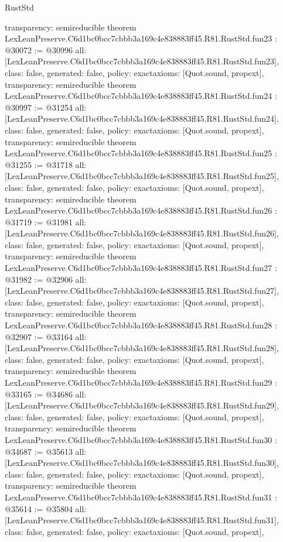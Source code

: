 \begin{lexlean}{RustStd}
\begin{coremodule}
{  transparency: semireducible
}
theorem LexLeanPreserve.C6d1bc0bcc7cbbb3a169c4e838883ff45.R81.RustStd.fun23 : @30072 := @30996 {
  all: [LexLeanPreserve.C6d1bc0bcc7cbbb3a169c4e838883ff45.R81.RustStd.fun23],
  class: false,
  generated: false,
  policy: exact{axioms: [Quot.sound, propext]},
  transparency: semireducible
}
theorem LexLeanPreserve.C6d1bc0bcc7cbbb3a169c4e838883ff45.R81.RustStd.fun24 : @30997 := @31254 {
  all: [LexLeanPreserve.C6d1bc0bcc7cbbb3a169c4e838883ff45.R81.RustStd.fun24],
  class: false,
  generated: false,
  policy: exact{axioms: [Quot.sound, propext]},
  transparency: semireducible
}
theorem LexLeanPreserve.C6d1bc0bcc7cbbb3a169c4e838883ff45.R81.RustStd.fun25 : @31255 := @31718 {
  all: [LexLeanPreserve.C6d1bc0bcc7cbbb3a169c4e838883ff45.R81.RustStd.fun25],
  class: false,
  generated: false,
  policy: exact{axioms: [Quot.sound, propext]},
  transparency: semireducible
}
theorem LexLeanPreserve.C6d1bc0bcc7cbbb3a169c4e838883ff45.R81.RustStd.fun26 : @31719 := @31981 {
  all: [LexLeanPreserve.C6d1bc0bcc7cbbb3a169c4e838883ff45.R81.RustStd.fun26],
  class: false,
  generated: false,
  policy: exact{axioms: [Quot.sound, propext]},
  transparency: semireducible
}
theorem LexLeanPreserve.C6d1bc0bcc7cbbb3a169c4e838883ff45.R81.RustStd.fun27 : @31982 := @32906 {
  all: [LexLeanPreserve.C6d1bc0bcc7cbbb3a169c4e838883ff45.R81.RustStd.fun27],
  class: false,
  generated: false,
  policy: exact{axioms: [Quot.sound, propext]},
  transparency: semireducible
}
theorem LexLeanPreserve.C6d1bc0bcc7cbbb3a169c4e838883ff45.R81.RustStd.fun28 : @32907 := @33164 {
  all: [LexLeanPreserve.C6d1bc0bcc7cbbb3a169c4e838883ff45.R81.RustStd.fun28],
  class: false,
  generated: false,
  policy: exact{axioms: [Quot.sound, propext]},
  transparency: semireducible
}
theorem LexLeanPreserve.C6d1bc0bcc7cbbb3a169c4e838883ff45.R81.RustStd.fun29 : @33165 := @34686 {
  all: [LexLeanPreserve.C6d1bc0bcc7cbbb3a169c4e838883ff45.R81.RustStd.fun29],
  class: false,
  generated: false,
  policy: exact{axioms: [Quot.sound, propext]},
  transparency: semireducible
}
theorem LexLeanPreserve.C6d1bc0bcc7cbbb3a169c4e838883ff45.R81.RustStd.fun30 : @34687 := @35613 {
  all: [LexLeanPreserve.C6d1bc0bcc7cbbb3a169c4e838883ff45.R81.RustStd.fun30],
  class: false,
  generated: false,
  policy: exact{axioms: [Quot.sound, propext]},
  transparency: semireducible
}
theorem LexLeanPreserve.C6d1bc0bcc7cbbb3a169c4e838883ff45.R81.RustStd.fun31 : @35614 := @35804 {
  all: [LexLeanPreserve.C6d1bc0bcc7cbbb3a169c4e838883ff45.R81.RustStd.fun31],
  class: false,
  generated: false,
  policy: exact{axioms: [Quot.sound, propext]},
}
\end{coremodule}
\end{lexlean}

